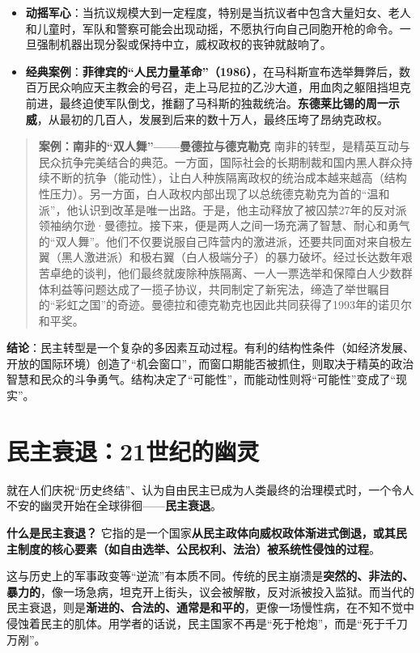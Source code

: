 \begin{itemize}
\begin{itemize}
        \item \textbf{动摇军心}：当抗议规模大到一定程度，特别是当抗议者中包含大量妇女、老人和儿童时，军队和警察可能会出现动摇，不愿执行向自己同胞开枪的命令。一旦强制机器出现分裂或保持中立，威权政权的丧钟就敲响了。
        \item \textbf{经典案例}：\textbf{菲律宾的“人民力量革命”（1986）}，在马科斯宣布选举舞弊后，数百万民众响应天主教会的号召，走上马尼拉的乙沙大道，用血肉之躯阻挡坦克前进，最终迫使军队倒戈，推翻了马科斯的独裁统治。\textbf{东德莱比锡的周一示威}，从最初的几百人，发展到后来的数十万人，最终压垮了昂纳克政权。
    \end{itemize}
    \begin{quote}
    \textbf{案例：南非的“双人舞”——曼德拉与德克勒克}
    南非的转型，是精英互动与民众抗争完美结合的典范。一方面，国际社会的长期制裁和国内黑人群众持续不断的抗争（能动性），让白人种族隔离政权的统治成本越来越高（结构性压力）。另一方面，白人政权内部出现了以总统德克勒克为首的“温和派”，他认识到改革是唯一出路。于是，他主动释放了被囚禁27年的反对派领袖纳尔逊·曼德拉。接下来，便是两人之间一场充满了智慧、耐心和勇气的“双人舞”。他们不仅要说服自己阵营内的激进派，还要共同面对来自极左翼（黑人激进派）和极右翼（白人极端分子）的暴力破坏。经过长达数年艰苦卓绝的谈判，他们最终就废除种族隔离、一人一票选举和保障白人少数群体利益等问题达成了一揽子协议，共同制定了新宪法，缔造了举世瞩目的“彩虹之国”的奇迹。曼德拉和德克勒克也因此共同获得了1993年的诺贝尔和平奖。
    \end{quote}
\end{itemize}

\textbf{结论}：民主转型是一个复杂的多因素互动过程。有利的结构性条件（如经济发展、开放的国际环境）创造了“机会窗口”，而窗口期能否被抓住，则取决于精英的政治智慧和民众的斗争勇气。结构决定了“可能性”，而能动性则将“可能性”变成了“现实”。

\section{民主衰退：21世纪的幽灵}

就在人们庆祝“历史终结”、认为自由民主已成为人类最终的治理模式时，一个令人不安的幽灵开始在全球徘徊——\textbf{民主衰退}。

\textbf{什么是民主衰退？} 它指的是一个国家\textbf{从民主政体向威权政体渐进式倒退，或其民主制度的核心要素（如自由选举、公民权利、法治）被系统性侵蚀的过程}。

这与历史上的军事政变等“逆流”有本质不同。传统的民主崩溃是\textbf{突然的、非法的、暴力的}，像一场急病，坦克开上街头，议会被解散，反对派被投入监狱。而当代的民主衰退，则是\textbf{渐进的、合法的、通常是和平的}，更像一场慢性病，在不知不觉中侵蚀着民主的肌体。用学者的话说，民主国家不再是“死于枪炮”，而是“死于千刀万剐”。

